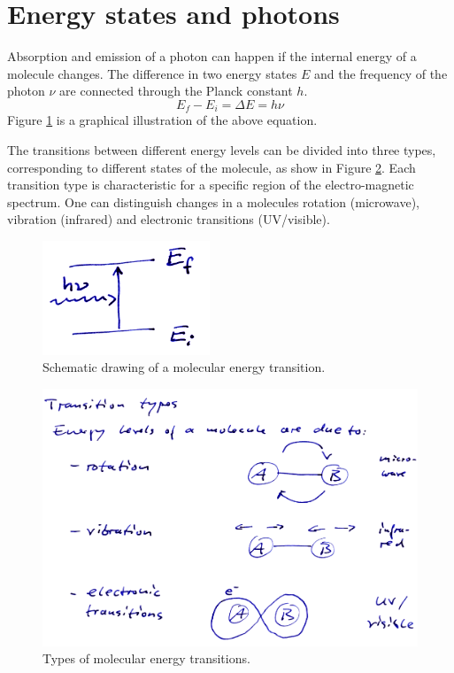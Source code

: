 \section{Energy states and photons}
\label{sec:energy-states}
Absorption and emission of a photon can happen if the internal energy of a
molecule changes. The difference in two energy states $E$ and the frequency of
the photon $\nu$ are connected through the Planck constant $h$.
\begin{equation}
  E_f - E_i = \Delta E = h \nu
\end{equation}
Figure \ref{fig:schematic_energies} is a graphical illustration of the
above equation.

The transitions between different energy levels can be divided into
three types, corresponding to different states of the molecule, as
show in Figure \ref{fig:transition_types}.  Each transition type is
characteristic for a specific region of the electro-magnetic spectrum.
One can distinguish changes in a molecules rotation (microwave),
vibration (infrared) and electronic transitions (UV/visible).

\begin{figure}
  \centering
  \includegraphics[width=5cm]{figures/schematic_energy_states}
  \caption{Schematic drawing of a molecular energy transition.}
  \label{fig:schematic_energies}
\end{figure}

\begin{figure}
  \centering
  \includegraphics[width=\hsize]{figures/transition_types}
  \caption{Types of molecular energy transitions.}
  \label{fig:transition_types}
\end{figure}

